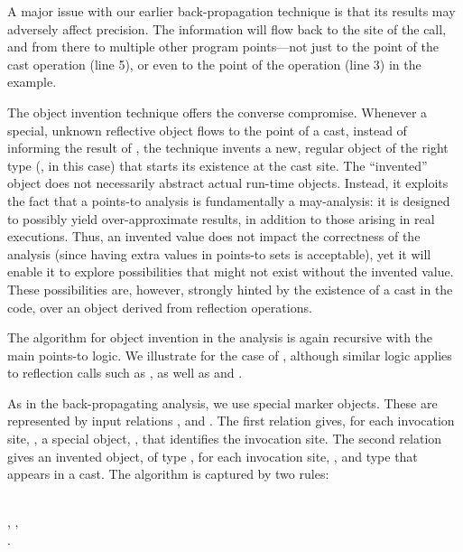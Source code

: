 A major issue with our earlier back-propagation technique is that its
results may adversely affect precision. The information will flow back
to the site of the  call, and from there to multiple other
program points---not just to the point of the cast operation (line 5),
or even to the point of the  operation (line 3) in the
example.

The object invention technique offers the converse compromise.
Whenever a special, unknown reflective object flows to the point of a
cast, instead of informing the result of , the technique
invents a new, regular object of the right type (, in this
case) that starts its existence at the cast site. The ``invented''
object does not necessarily abstract actual run-time objects.
Instead, it exploits the fact that a points-to analysis is
fundamentally a may-analysis: it is designed to possibly yield
over-approximate results, in addition to those arising in real
executions. Thus, an invented value does not impact the correctness of
the analysis (since having extra values in points-to sets is
acceptable), yet it will enable it to explore possibilities that might
not exist without the invented value. These possibilities are,
however, strongly hinted by the existence of a cast in the code, over
an object derived from reflection operations.

The algorithm for object invention in the analysis is again recursive
with the main points-to logic. We illustrate for the case of
, although similar logic applies to
reflection calls such as , as
well as  and .

As in the back-propagating analysis, we use special marker
objects.  These are represented by input relations
, and
. The first relation
gives, for each  invocation site, , a special
object, , that identifies the invocation site. The second
relation gives an invented object,  of type , for each
 invocation site, , and type  that
appears in a cast.  The algorithm is captured by two rules:

\begin{rules}
  \\
\tab {}, , \\
\tab {}.\\
\end{rules}

